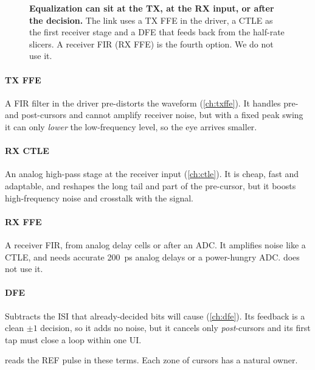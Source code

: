 \begin{figure}[!tbp]
\caption{\textbf{Equalization can sit at the TX, at the RX input, or after the decision.} The \OS{} link uses a TX FFE in the driver, a CTLE as the first receiver stage and a DFE that feeds back from the half-rate slicers. A receiver FIR (RX FFE) is the fourth option. We do not use it.}
\label{fig:ch5-eqmap}
\end{figure}

\paragraph{TX FFE} A FIR filter in the driver pre-distorts the waveform (\cref{ch:txffe}). It handles pre- and post-cursors and cannot amplify receiver noise, but with a fixed peak swing it can only \emph{lower} the low-frequency level, so the eye arrives smaller.

\paragraph{RX CTLE} An analog high-pass stage at the receiver input (\cref{ch:ctle}). It is cheap, fast and adaptable, and reshapes the long tail and part of the pre-cursor, but it boosts high-frequency noise and crosstalk with the signal.

\paragraph{RX FFE} A receiver FIR, from analog delay cells or after an ADC. It amplifies noise like a CTLE, and needs accurate \qty{200}{\pico\second} analog delays or a power-hungry ADC. \OS{} does not use it.

\paragraph{DFE} Subtracts the ISI that already-decided bits will cause (\cref{ch:dfe}). Its feedback is a clean $\pm1$ decision, so it adds no noise, but it cancels only \emph{post}-cursors and its first tap must close a loop within one UI.

 reads the REF pulse in these terms. Each zone of cursors has a natural owner.

